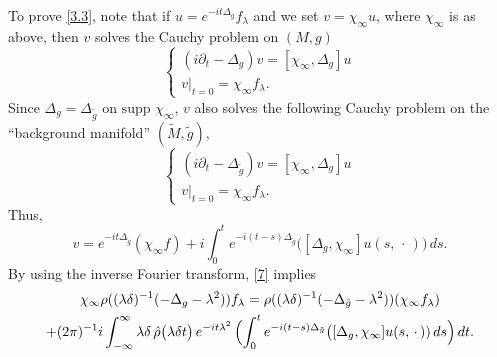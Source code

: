 \documentclass[10pt]{amsart}
\newcommand{\la}{\lambda}
\newcommand{\1}{{\bf 1}}
\begin{document}
To prove \eqref{3.3}, note that if $u=e^{-it\Delta_g}f_\la$ and we set $v=\chi_\infty u$, where $\chi_\infty$ is as above,
then $v$ solves the Cauchy problem on $(M,g)$
\begin{equation}\label{5}
\begin{cases}
(i\partial_t-\Delta_g)v=[\chi_\infty, \Delta_g]u
\\
v|_{t=0}=\chi_\infty f_\la.
\end{cases}
\end{equation}
Since $\Delta_g=\Delta_{\tilde g}$ on $\text{supp }\chi_\infty$, $v$ also solves the following Cauchy problem
on the ``background manifold'' $(\tilde M,\tilde g)$,
\begin{equation}\label{6}
\begin{cases}
(i\partial_t-\Delta_{\tilde g})v=[\chi_\infty, \Delta_g]u
\\
v|_{t=0}=\chi_\infty f_\la.
\end{cases}
\end{equation}
Thus,
\begin{equation}\label{7}
v=e^{-it\Delta_{\tilde g}}(\chi_\infty f)+i\int_0^t e^{-i(t-s)\Delta_{\tilde g}}\bigl(
[\Delta_g,\chi_\infty] u(s, \, \cdot \, )\bigr) \, ds. 
\end{equation}
By using the inverse Fourier transform, \eqref{7} implies
\begin{multline}\label{2.3}
\chi_\infty \rho((\la \delta)^{-1}(-\Delta_g-\la^2))f_\la = \rho((\la \delta)^{-1}(-\Delta_{\tilde g}-\la^2))(\chi_\infty f_\la)
\\
+(2\pi)^{-1} i
\int_{-\infty}^\infty \la\delta \, \Hat \rho\bigl( \la\delta t\bigr) \, e^{-it\la^2}
\, 
\Bigl(\int_0^t e^{-i(t-s)\Delta_{\tilde g}}\bigl([\Delta_g,\chi_\infty]u(s,\, \cdot\,)) \, ds\Bigr) \, dt.
\end{multline}
\end{document}
